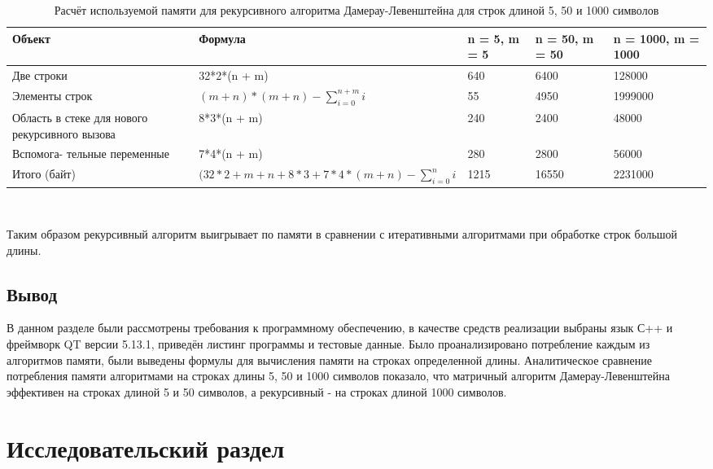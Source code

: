 \documentclass[a4paper,12pt]{article}
\begin{document}
	\begin{table} [h!]	
	\begin{center}
	\caption{Расчёт используемой памяти для рекурсивного алгоритма Дамерау-Левенштейна для строк длиной 5, 50 и 1000 символов}
	\begin{tabular}{|p{3cm}|p{4cm}|p{1.2cm}|p{1.5cm}|p{2cm}|}

	\hline 
	Объект & Формула & n = 5, m = 5	& n = 50, m = 50 & n = 1000, m = 1000 \\ 
	\hline 
	Две строки & 32*2*(n + m) & 640 & 6400 & 128000\\ 
	\hline 
	Элементы строк  & $(m + n)*(m + n) -  \sum_{i=0}^{n + m}i$ & 55 & 4950 & 1999000\\ 
	\hline 
	Область в стеке для нового рекурсивного вызова & 8*3*(n + m) & 240 & 2400 & 48000 \\ 
	\hline 
	Вспомога- тельные переменные  & 7*4*(n + m)  & 280 & 2800 & 56000\\ 
	\hline 
	Итого (байт) & $(32*2 + m + n + 8*3 + 7*4*(m+n) - \sum_{i=0}^{n}i$ & 1215 & 16550 & 2231000 \\ 

	\hline 
	\end{tabular} \\
    \label{table:table_memory_4}
    \end{center}
	\end{table}
	
	Таким образом рекурсивный алгоритм выигрывает по памяти в сравнении
с итеративными алгоритмами при обработке строк большой длины.
	
	
	\subsection*{Вывод}
	
	В данном разделе были рассмотрены требования к программному обеспечению, в качестве средств реализации выбраны язык С++ и фреймворк QT версии 5.13.1, приведён листинг программы и тестовые данные. Было проанализировано потребление каждым из алгоритмов памяти, были выведены формулы для вычисления памяти на строках определенной длины. Аналитическое сравнение потребления памяти алгоритмами на строках длины 5, 50 и 1000 символов показало, что  матричный алгоритм Дамерау-Левенштейна эффективен на строках длиной 5 и 50 символов, а рекурсивный  - на строках длиной 1000 символов.
\pagebreak

\section{Исследовательский раздел}
\end{document}
